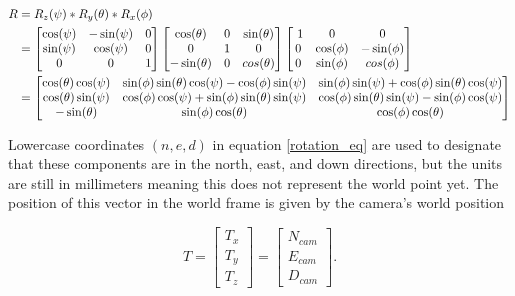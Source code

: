   \begin{align}
  \label{rotation_equation}
  R &= R_z(\psi)*R_y(\theta)*R_x(\phi) \\ \notag
    &= \begin{bmatrix} \cos(\psi)  & -\sin(\psi) & 0 \\ 
                        \sin(\psi) & \cos(\psi) & 0 \\
                         0         &   0         & 1  \end{bmatrix} 
       \begin{bmatrix} \cos(\theta) & 0 & \sin(\theta) \\ 
                             0      & 1 &       0        \\
                      -\sin(\theta) & 0 & cos(\theta) \end{bmatrix}
       \begin{bmatrix} \ 1 &    0       & 0           \\ 
                         0 & \cos(\phi) & -\sin(\phi) \\
                         0 & \sin(\phi) & cos(\phi)  \end{bmatrix} \\ \notag
    &= \begin{bmatrix} \cos(\theta)\cos(\psi) & \sin(\phi)\sin(\theta)\cos(\psi) - \cos(\phi)\sin(\psi) &  \sin(\phi)\sin(\psi) +  \cos(\phi)\sin(\theta)\cos(\psi) \\
    \cos(\theta)\sin(\psi) & \cos(\phi)\cos(\psi) + \sin(\phi)\sin(\theta)\sin(\psi) &  \cos(\phi)\sin(\theta)\sin(\psi) - \sin(\phi)\cos(\psi) \\
     -\sin(\theta) & \sin(\phi)\cos(\theta) & \cos(\phi)\cos(\theta)     \end{bmatrix}
  \end{align}
  
 Lowercase coordinates $(n,e,d)$ in equation \ref{rotation_eq} are used to designate that these components are in the north, east, and down directions, but the units are still in millimeters meaning this does not represent the world point yet.  The position of this vector in the world frame is given by the camera's world position

 \begin{equation}
 \label{translation_equation}
 T = 
 \begin{bmatrix} T_x \\ T_y \\ T_z \end{bmatrix} =
 \begin{bmatrix} N_{cam} \\ E_{cam} \\ D_{cam} \end{bmatrix}
 .
 \end{equation}

